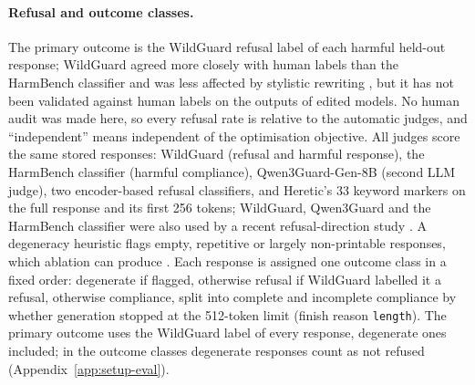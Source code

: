 \paragraph{Refusal and outcome classes.} The primary outcome is the
WildGuard \cite{han2024wildguard} refusal label of each harmful held-out
response; WildGuard agreed more closely with human labels than the HarmBench
classifier and was less affected by stylistic rewriting
\cite{xie2025sorrybench,eiras2025know}, but it has not been validated against
human labels on the outputs of edited models. No human audit was made here, so
every refusal rate is relative to the automatic judges, and ``independent''
means independent of the optimisation objective.
All judges score the same stored responses: WildGuard (refusal and
harmful response), the HarmBench classifier (harmful compliance),
Qwen3Guard-Gen-8B \cite{zhao2025qwen3guard} (second LLM judge), two
encoder-based refusal classifiers, and Heretic's 33 keyword markers on the full
response and its first 256 tokens; WildGuard, Qwen3Guard and the HarmBench
classifier were also used by a recent refusal-direction study
\cite{evseev2026wrdo}. A degeneracy heuristic flags empty, repetitive or
largely non-printable responses, which ablation can produce
\cite{marshall2024refusal}. Each response is assigned one outcome class in a
fixed order: degenerate if flagged, otherwise refusal if WildGuard labelled it
a refusal, otherwise compliance, split into complete and incomplete compliance
by whether generation stopped at the 512-token limit (finish reason
\texttt{length}). The primary outcome uses the WildGuard label of every
response, degenerate ones included; in the outcome classes degenerate
responses count as not refused (Appendix~\ref{app:setup-eval}).

